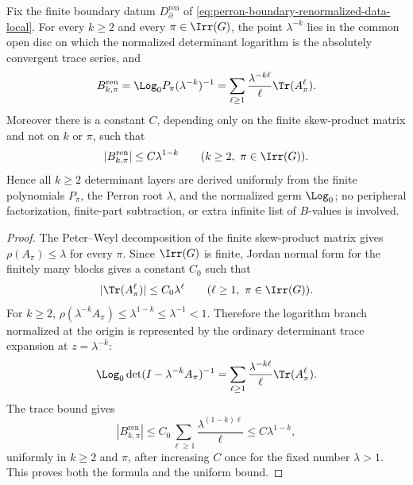 \begin{lemma}
  \label{lem:perron-boundary-uniform-interior-layers}
  Fix the finite boundary datum
  \(D_{\partial}^{\mathrm{ren}}\) of
  \eqref{eq:perron-boundary-renormalized-data-local}.  For every
  \(k\ge2\) and every \(\pi\in\Irr(G)\), the point
  \(\lambda^{-k}\) lies in the common open disc on which the normalized
  determinant logarithm is the absolutely convergent trace series, and
  \[
    B_{k,\pi}^{\mathrm{ren}}
    =
    \Log_0 P_\pi(\lambda^{-k})^{-1}
    =
    \sum_{\ell\ge1}
      \frac{\lambda^{-k\ell}}{\ell}\Tr(A_\pi^\ell).
  \]
  Moreover there is a constant \(C\), depending only on the finite
  skew-product matrix and not on \(k\) or \(\pi\), such that
  \begin{equation}\label{eq:perron-boundary-uniform-interior-layer-bound}
    |B_{k,\pi}^{\mathrm{ren}}|\le C\lambda^{1-k}
    \qquad(k\ge2,\ \pi\in\Irr(G)).
  \end{equation}
  Hence all \(k\ge2\) determinant layers are derived uniformly from the
  finite polynomials \(P_\pi\), the Perron root \(\lambda\), and the
  normalized germ \(\Log_0\); no peripheral factorization, finite-part
  subtraction, or extra infinite list of \(B\)-values is involved.
\end{lemma}

\begin{proof}
  The Peter--Weyl decomposition of the finite skew-product matrix gives
  \(\rho(A_\pi)\le\lambda\) for every \(\pi\).  Since \(\Irr(G)\) is finite,
  Jordan normal form for the finitely many blocks gives a constant \(C_0\)
  such that
  \[
    |\Tr(A_\pi^\ell)|\le C_0\lambda^\ell
    \qquad(\ell\ge1,\ \pi\in\Irr(G)).
  \]
  For \(k\ge2\),
  \(\rho(\lambda^{-k}A_\pi)\le\lambda^{1-k}\le\lambda^{-1}<1\).
  Therefore the logarithm branch normalized at the origin is represented by
  the ordinary determinant trace expansion at \(z=\lambda^{-k}\):
  \[
    \Log_0\det(I-\lambda^{-k}A_\pi)^{-1}
    =
    \sum_{\ell\ge1}\frac{\lambda^{-k\ell}}{\ell}\Tr(A_\pi^\ell).
  \]
  The trace bound gives
  \[
    |B_{k,\pi}^{\mathrm{ren}}|
    \le
    C_0\sum_{\ell\ge1}\frac{\lambda^{(1-k)\ell}}{\ell}
    \le C\lambda^{1-k},
  \]
  uniformly in \(k\ge2\) and \(\pi\), after increasing \(C\) once for
  the fixed number \(\lambda>1\).  This proves both the formula and the
  uniform bound.
\end{proof}

